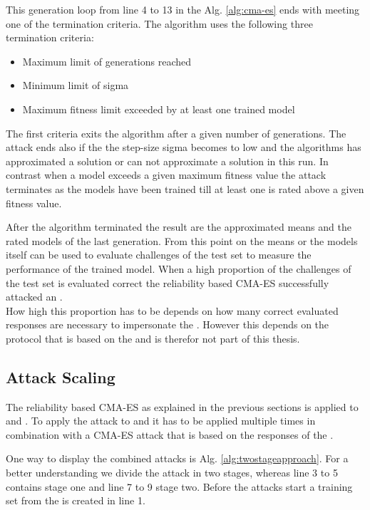 This generation loop from line 4 to 13 in the Alg. \ref{alg:cma-es} ends with meeting one of the termination criteria.
The algorithm uses the following three termination criteria:

\begin{itemize}
\item Maximum limit of generations reached
\item Minimum limit of sigma
\item Maximum fitness limit exceeded by at least one trained model
\end{itemize}

The first criteria exits the algorithm after a given number of generations.
The attack ends also if the the step-size sigma becomes to low and the algorithms has approximated a solution or can not approximate a solution in this run.
In contrast when a model exceeds a given maximum fitness value the attack terminates as the models have been trained till at least one is rated above a given fitness value.

After the algorithm terminated the result are the approximated means and the rated models of the last generation.
From this point on the means or the models itself can be used to evaluate challenges of the test set to measure the performance of the trained model. 
When a high proportion of the challenges of the test set is evaluated correct the reliability based \ac{CMA-ES} successfully attacked an \apuf.\\
How high this proportion has to be depends on how many correct evaluated responses are necessary to impersonate the \puf.
However this depends on the protocol that is based on the \puf and is therefor not part of this thesis.


\subsection{Attack Scaling}
\label{sec:attackscaling}

The reliability based \ac{CMA-ES} as explained in the previous sections is applied to \apufs and \mpuf.
To apply the attack to \xpufs and \mxpuf it has to be applied multiple times in combination with a \ac{CMA-ES} attack that is based on the responses of the \puf.

One way to display the combined attacks is Alg. \ref{alg:twostageapproach}.
For a better understanding we divide the attack in two stages, whereas line 3 to 5 contains stage one and line 7 to 9 stage two.
Before the attacks start a training set from the \xpuf is created in line 1.

